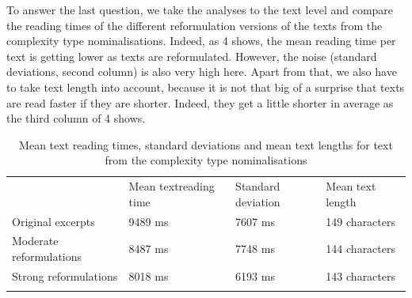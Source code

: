 \documentclass[output=paper]{langsci/langscibook}
\begin{document}
To answer the last question, we take the analyses to the text level and compare the reading times of the different reformulation versions of the texts from the complexity type nominalisations. Indeed, as 4 shows, the mean reading time per text is getting lower as texts are reformulated. However, the noise (standard deviations, second column) is also very high here. Apart from that, we also have to take text length into account, because it is not that big of a surprise that texts are read faster if they are shorter. Indeed, they get a little shorter in average as the third column of 4 shows.
\begin{table}
\begin{tabularx}{\textwidth}{lXXX} 
& Mean text\newline reading time & Standard \newline deviation & Mean text \newline length\\
\lsptoprule
 Original excerpts & 9489 ms & 7607 ms & 149 characters\\
 Moderate reformulations & 8487 ms & 7748 ms & 144 characters\\
 Strong reformulations & 8018 ms & 6193 ms & 143 characters\\
\lspbottomrule
\end{tabularx}
\caption{Mean text reading times, standard deviations and mean text lengths for text from the complexity type nominalisations}
\label{wolfer:tab:4}
\end{table}
\end{document}
